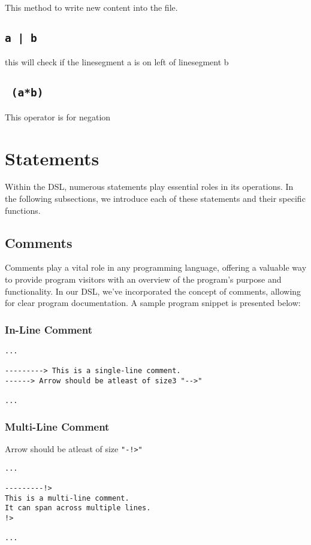 \documentclass{article}
\begin{document}
This method to write new content into the file.
\subsection{\texttt{a | b}}

this  will check if the linesegment a is on left of linesegment b
\subsection{\texttt{\string~(a*b)}}


This operator is for negation

\section{Statements}
Within the DSL, numerous statements play essential roles in its operations. In the following subsections, we introduce each of these statements and their specific functions.

\subsection{Comments}
Comments play a vital role in any programming language, offering a valuable way to provide program visitors with an overview of the program's purpose and functionality. In our DSL, we've incorporated the concept of comments, allowing for clear program documentation. A sample program snippet is presented below:

\subsubsection{In-Line Comment}
\begin{verbatim}
...

---------> This is a single-line comment.
------> Arrow should be atleast of size3 "-->"

...
\end{verbatim}

\subsubsection{Multi-Line Comment}
Arrow should be atleast of size \texttt{"-!>"}
\begin{verbatim}
...

---------!>
This is a multi-line comment.
It can span across multiple lines.
!>

...
\end{verbatim}
\end{document}
